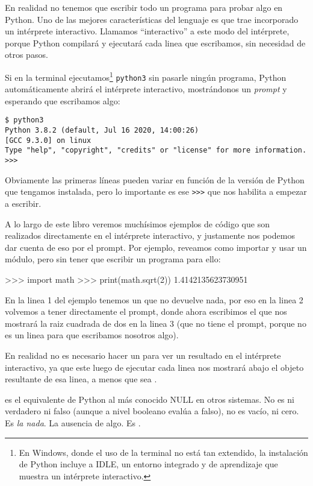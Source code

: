 En realidad no tenemos que escribir todo un programa para probar algo en Python. Uno de las mejores características del lenguaje es que trae incorporado un intérprete interactivo. Llamamos ``interactivo'' a este modo del intérprete, porque Python compilará y ejecutará cada linea que escribamos, sin necesidad de otros pasos. 

Si en la terminal ejecutamos\footnote{En Windows, donde el uso de la terminal no está tan extendido, la instalación de Python incluye a IDLE, un entorno integrado y de aprendizaje que muestra un intérprete interactivo.} \texttt{python3} sin pasarle ningún programa, Python automáticamente abrirá el intérprete interactivo, mostrándonos un \textit{prompt} y esperando que escribamos algo:

\begin{verbatim}
$ python3
Python 3.8.2 (default, Jul 16 2020, 14:00:26) 
[GCC 9.3.0] on linux
Type "help", "copyright", "credits" or "license" for more information.
>>> 
\end{verbatim}

Obviamente las primeras líneas pueden variar en función de la versión de Python que tengamos instalada, pero lo importante es ese \texttt{\textgreater\textgreater\textgreater} que nos habilita a empezar a escribir.

A lo largo de este libro veremos muchísimos ejemplos de código que son realizados directamente en el intérprete interactivo, y justamente nos podemos dar cuenta de eso por el prompt. Por ejemplo, reveamos como importar y usar un módulo, pero sin tener que escribir un programa para ello:

\begin{py}
>>> import math
>>> print(math.sqrt(2))
1.4142135623730951
\end{py}

En la linea 1 del ejemplo tenemos un  que no devuelve nada, por eso en la linea 2 volvemos a tener directamente el prompt, donde ahora escribimos el  que nos mostrará la raiz cuadrada de dos en la linea 3 (que no tiene el prompt, porque no es un linea para que escribamos nosotros algo).

En realidad no es necesario hacer un  para ver un resultado en el intérprete interactivo, ya que este luego de ejecutar cada linea nos mostrará abajo el objeto resultante de esa linea, a menos que sea .

\begin{info}
 es el equivalente de Python al más conocido NULL en otros sistemas. No es ni verdadero ni falso (aunque a nivel booleano evalúa a falso), no es vacío, ni cero. Es \textit{la nada}. La ausencia de algo. Es .
\end{info}


